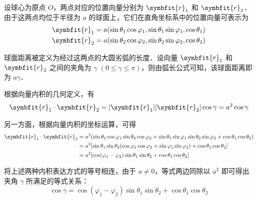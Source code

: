 \begin{myproof}
    设球心为原点 $O$，两点对应的位置向量分别为 $\symbfit{r}_1$ 和 $\symbfit{r}_2$．由于这两点均位于半径为 $a$ 的球面上，它们在直角坐标系中的位置向量可表示为
    \begin{equation}
        \begin{aligned}
            \symbfit{r}_1 & = a (\sin\theta_1 \cos\varphi_1, \sin\theta_1 \sin\varphi_1, \cos\theta_1) \\
            \symbfit{r}_2 & = a (\sin\theta_2 \cos\varphi_2, \sin\theta_2 \sin\varphi_2, \cos\theta_2)
        \end{aligned}
    \end{equation}

    球面距离被定义为经过这两点的大圆劣弧的长度．设向量 $\symbfit{r}_1$ 和 $\symbfit{r}_2$ 之间的夹角为 $\gamma$ $(0 \leqslant \gamma \leqslant \pi)$，则由弧长公式可知，该球面距离即为 $a\gamma$．

    根据向量内积的几何定义，有
    \begin{equation}
        \symbfit{r}_1 \cdot \symbfit{r}_2 = |\symbfit{r}_1| |\symbfit{r}_2| \cos\gamma = a^2 \cos\gamma
    \end{equation}

    另一方面，根据向量内积的坐标运算，可得
    \begin{equation}
        \begin{aligned}
            \symbfit{r}_1 \cdot \symbfit{r}_2 & = a^2 (\sin\theta_1 \cos\varphi_1 \sin\theta_2 \cos\varphi_2 + \sin\theta_1 \sin\varphi_1 \sin\theta_2 \sin\varphi_2 + \cos\theta_1 \cos\theta_2) \\
                                              & = a^2 [\sin\theta_1 \sin\theta_2 (\cos\varphi_1 \cos\varphi_2 + \sin\varphi_1 \sin\varphi_2) + \cos\theta_1 \cos\theta_2]                         \\
                                              & = a^2 [\cos(\varphi_1 - \varphi_2) \sin\theta_1 \sin\theta_2 + \cos\theta_1 \cos\theta_2]
        \end{aligned}
    \end{equation}

    将上述两种内积表达方式的等号相连，由于 $a \neq 0$，等式两边同除以 $a^2$ 即可得出夹角 $\gamma$ 所满足的等式关系：
    \begin{equation}
        \boxed{\cos\gamma = \cos(\varphi_1 - \varphi_2) \sin\theta_1 \sin\theta_2 + \cos\theta_1 \cos\theta_2}
    \end{equation}
\end{myproof}

\endinput
